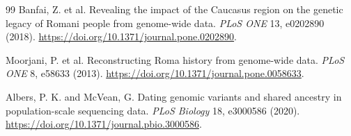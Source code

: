 \documentclass[11pt]{article}
\begin{document}
\begin{thebibliography}{99}
Banfai, Z. et al. Revealing the impact of the Caucasus region on the genetic legacy of Romani people from genome-wide data. \emph{PLoS ONE} 13, e0202890 (2018). \url{https://doi.org/10.1371/journal.pone.0202890}.

Moorjani, P. et al. Reconstructing Roma history from genome-wide data. \emph{PLoS ONE} 8, e58633 (2013). \url{https://doi.org/10.1371/journal.pone.0058633}.

Albers, P. K. and McVean, G. Dating genomic variants and shared ancestry in population-scale sequencing data. \emph{PLoS Biology} 18, e3000586 (2020). \url{https://doi.org/10.1371/journal.pbio.3000586}.

\end{thebibliography}
\end{document}
